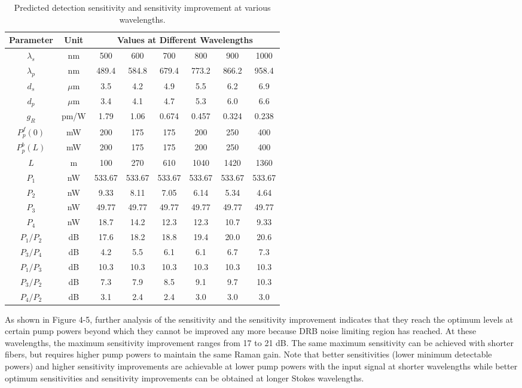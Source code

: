 \begin{table}[t]
\begin{centering}
\begin{tabular}{|c|c|c|c|c|c|c|c|} \hline
Parameter & Unit & \multicolumn{6}{|c|}{Values at Different Wavelengths} \\ \hline\hline
$\lambda_s$ & nm & 500 & 600 & 700 & 800 & 900 & 1000 \\ \hline
$\lambda_p$ & nm & 489.4 & 584.8 & 679.4 & 773.2 & 866.2 & 958.4 \\ \hline
$d_s$ & $\mu$m & 3.5 & 4.2 & 4.9 & 5.5 & 6.2 & 6.9 \\ \hline
$d_p$ & $\mu$m & 3.4 & 4.1 & 4.7 & 5.3 & 6.0 & 6.6 \\ \hline
$g_R$ & pm/W & 1.79 & 1.06 & 0.674 & 0.457 & 0.324 & 0.238 \\ \hline
$P_p^f(0)$ &mW & 200 & 175 & 175 & 200 & 250 & 400 \\ \hline
$P_p^b(L)$ &mW & 200 & 175 & 175 & 200 & 250 & 400 \\ \hline
$L$ &m & 100 & 270 & 610 & 1040 & 1420 & 1360 \\ \hline
$P_1$ &nW  & 533.67 & 533.67 & 533.67 & 533.67 & 533.67 & 533.67 \\ \hline
$P_2$ &nW  & 9.33 & 8.11 & 7.05 & 6.14 & 5.34 & 4.64 \\ \hline
$P_3$ &nW  & 49.77 & 49.77 & 49.77 & 49.77 & 49.77 & 49.77 \\ \hline
$P_4$ &nW  & 18.7 & 14.2 & 12.3 & 12.3 & 10.7 & 9.33 \\ \hline
$P_1/P_2$ &dB & 17.6 & 18.2 & 18.8 & 19.4 & 20.0 & 20.6 \\ \hline
$P_3/P_4$ &dB  & 4.2 & 5.5 & 6.1 & 6.1 & 6.7 & 7.3 \\ \hline
$P_1/P_3$ &dB & 10.3 & 10.3 & 10.3 & 10.3 & 10.3 & 10.3 \\ \hline
$P_3/P_2$ &dB  & 7.3 & 7.9 & 8.5 & 9.1 & 9.7 & 10.3 \\ \hline
$P_4/P_2$ &dB  & 3.1 & 2.4 & 2.4 & 3.0 & 3.0 & 3.0 \\ \hline
\end{tabular}
\caption{Predicted detection sensitivity and sensitivity improvement at various wavelengths.}
\label{tbl:JOSAA2013_Table2}
\end{centering}
\end{table}
 
As shown in Figure 4-5, further analysis of the sensitivity and the sensitivity improvement indicates that they reach the optimum levels at certain pump powers beyond which they cannot be improved any more because DRB noise limiting region has reached. At these wavelengths, the maximum sensitivity improvement ranges from 17 to 21 dB. The same maximum sensitivity can be achieved with shorter fibers, but requires higher pump powers to maintain the same Raman gain. Note that better sensitivities (lower minimum detectable powers) and higher sensitivity improvements are achievable at lower pump powers with the input signal at shorter wavelengths while better optimum sensitivities and sensitivity improvements can be obtained at longer Stokes wavelengths.

